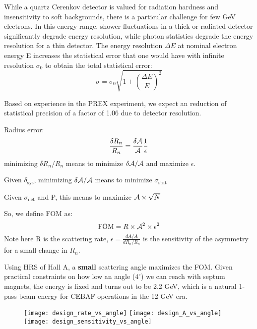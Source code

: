     While a quartz Cerenkov detector is valued for radiation hardness and insensitivity to soft backgrounds, there is a particular challenge for few GeV electrons. In this energy range, shower fluctuations in a thick or radiated detector significantly degrade energy resolution, while photon statistics degrade the energy resolution for a thin detector. The energy resolution $\Delta E$ at nominal electron energy E increases the statistical error that one would have with infinite resolution $\sigma_0$ to obtain the total statistical error:
$$ \sigma = \sigma_0\sqrt{1+\left(\frac{\Delta E}{E}\right)^2}$$
    
Based on experience in the PREX experiment, we expect an reduction of statistical precision of a factor of 1.06 due to detector resolution.

\bigskip
Radius error:
\begin{equation*}
    \frac{\delta R_n}{R_n} = \frac{\delta \mathcal{A}}{\mathcal{A}}\frac{1}{\epsilon}
\end{equation*}
minimizing $\delta R_n/R_n$ means to minimize $\delta \mathcal{A}/\mathcal{A}$ and maximize $\epsilon$. 

Given $\delta_{\text{sys}}$, minimizing $\delta\mathcal{A}/\mathcal{A}$ means to minimize $\sigma_{\text{stat}}$

Given $\sigma_{\text{det}}$ and P, this means to maximize $\mathcal{A} \times \sqrt{N}$

So, we define FOM as:
\begin{equation*}
    \text{FOM} = R \times \mathcal{A}^2 \times \epsilon^2
\end{equation*}
Note here R is the scattering rate, $\epsilon = \frac{dA/A}{dR_n/R_n}$ is the sensitivity of the asymmetry for a small change in $R_n$.

\bigskip
Using HRS of Hall A, a \textbf{small} scattering angle maximizes the FOM. 
Given practical constraints on how low an angle ($4^\circ$) we can reach with 
septum magnets, the energy is fixed and turns out to be 2.2 GeV, which is a 
natural 1-pass beam energy for CEBAF operations in the 12 GeV era.

\begin{figure}[h!]
    \texttt{[image: design\_rate\_vs\_angle]}
    \texttt{[image: design\_A\_vs\_angle]}
    \texttt{[image: design\_sensitivity\_vs\_angle]}
    \label{fig:FOM}
\end{figure}

